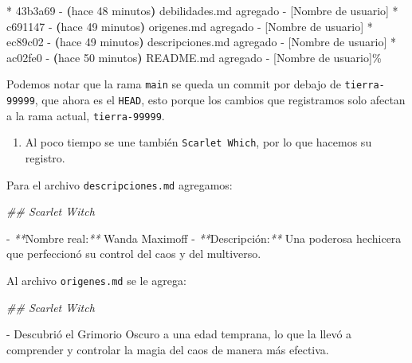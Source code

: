 \documentclass[
]{book}
\newenvironment{Shaded}{\begin{snugshade}}{\end{snugshade}}
\newcommand{\AttributeTok}[1]{\textcolor[rgb]{0.13,0.29,0.53}{#1}}
\newcommand{\CommentTok}[1]{\textcolor[rgb]{0.56,0.35,0.01}{\textit{#1}}}
\newcommand{\ErrorTok}[1]{\textcolor[rgb]{0.64,0.00,0.00}{\textbf{#1}}}
\newcommand{\ExtensionTok}[1]{#1}
\newcommand{\KeywordTok}[1]{\textcolor[rgb]{0.13,0.29,0.53}{\textbf{#1}}}
\newcommand{\NormalTok}[1]{#1}
\newcommand{\PreprocessorTok}[1]{\textcolor[rgb]{0.56,0.35,0.01}{\textit{#1}}}
\providecommand{\tightlist}{%
  \setlength{\itemsep}{0pt}\setlength{\parskip}{0pt}}
\begin{document}
\begin{Shaded}
\begin{Highlighting}[]
\ExtensionTok{*}\NormalTok{ 43b3a69 }\AttributeTok{{-}} \ErrorTok{(}\ExtensionTok{hace}\NormalTok{ 48 minutos}\KeywordTok{)} \ExtensionTok{debilidades.md}\NormalTok{ agregado }\AttributeTok{{-}}\NormalTok{ [Nombre de usuario]}
\ExtensionTok{*}\NormalTok{ c691147 }\AttributeTok{{-}} \ErrorTok{(}\ExtensionTok{hace}\NormalTok{ 49 minutos}\KeywordTok{)} \ExtensionTok{origenes.md}\NormalTok{ agregado }\AttributeTok{{-}}\NormalTok{ [Nombre de usuario]}
\ExtensionTok{*}\NormalTok{ ec89c02 }\AttributeTok{{-}} \ErrorTok{(}\ExtensionTok{hace}\NormalTok{ 49 minutos}\KeywordTok{)} \ExtensionTok{descripciones.md}\NormalTok{ agregado }\AttributeTok{{-}}\NormalTok{ [Nombre de usuario]}
\ExtensionTok{*}\NormalTok{ ac02fe0 }\AttributeTok{{-}} \ErrorTok{(}\ExtensionTok{hace}\NormalTok{ 50 minutos}\KeywordTok{)} \ExtensionTok{README.md}\NormalTok{ agregado }\AttributeTok{{-}}\NormalTok{ [Nombre de usuario]\%        }
\end{Highlighting}
\end{Shaded}

Podemos notar que la rama \texttt{main} se queda un commit por debajo de \texttt{tierra-99999}, que ahora es el \texttt{HEAD}, esto porque los cambios que registramos solo afectan a la rama actual, \texttt{tierra-99999}.

\begin{enumerate}
\def\labelenumi{\arabic{enumi}.}
\setcounter{enumi}{5}
\tightlist
\item
  Al poco tiempo se une también \texttt{Scarlet\ Which}, por lo que hacemos su registro.
\end{enumerate}

Para el archivo \texttt{descripciones.md} agregamos:

\begin{Shaded}
\begin{Highlighting}[]

\CommentTok{\#\# Scarlet Witch}

\ExtensionTok{{-}} \PreprocessorTok{**}\NormalTok{Nombre real:}\PreprocessorTok{**}\NormalTok{ Wanda Maximoff}
\ExtensionTok{{-}} \PreprocessorTok{**}\NormalTok{Descripción:}\PreprocessorTok{**}\NormalTok{ Una poderosa hechicera que perfeccionó su control del caos y del multiverso.}
\end{Highlighting}
\end{Shaded}

Al archivo \texttt{origenes.md} se le agrega:

\begin{Shaded}
\begin{Highlighting}[]

\CommentTok{\#\# Scarlet Witch}

\ExtensionTok{{-}}\NormalTok{ Descubrió el Grimorio Oscuro a una edad temprana, lo que la llevó a comprender y controlar la magia del caos de manera más efectiva.}
\end{Highlighting}
\end{Shaded}
\end{document}
